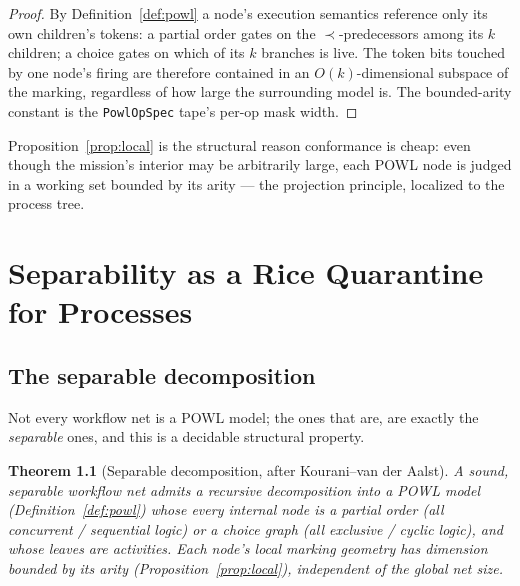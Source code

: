 \documentclass[11pt,oneside]{book}
\theoremstyle{definition}
\theoremstyle{plain}
\newtheorem{theorem}{Theorem}[chapter]
\theoremstyle{remark}
\newcommand{\code}[1]{\texttt{#1}}
\begin{document}
\begin{proof}
By Definition~\ref{def:powl} a node's execution semantics reference only its own children's
tokens: a partial order gates on the $\prec$-predecessors among its $k$ children; a choice
gates on which of its $k$ branches is live. The token bits touched by one node's firing are
therefore contained in an $O(k)$-dimensional subspace of the marking, regardless of how large
the surrounding model is. The bounded-arity constant is the \code{PowlOpSpec} tape's per-op
mask width. \end{proof}

Proposition~\ref{prop:local} is the structural reason conformance is cheap: even though the
mission's interior may be arbitrarily large, each POWL node is judged in a working set bounded
by its arity --- the projection principle, localized to the process tree.

\chapter{Separability as a Rice Quarantine for Processes}
\label{ch:sep}

\section{The separable decomposition}

Not every workflow net is a POWL model; the ones that are, are exactly the \emph{separable}
ones, and this is a decidable structural property.

\begin{theorem}[Separable decomposition, after Kourani--van der Aalst]\label{thm:sep}
A sound, separable workflow net admits a recursive decomposition into a POWL model
(Definition~\ref{def:powl}) whose every internal node is a partial order (all concurrent /
sequential logic) or a choice graph (all exclusive / cyclic logic), and whose leaves are
activities. Each node's local marking geometry has dimension bounded by its arity
(Proposition~\ref{prop:local}), independent of the global net size.
\end{theorem}
\end{document}
